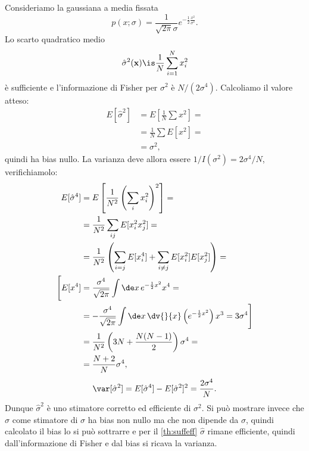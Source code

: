 \begin{example}
	Consideriamo la gaussiana a media fissata
	\begin{equation*}
		p(x;\sigma)
		= \frac1{\sqrt{2\pi}\sigma} e^{-\frac12 \frac{x^2}{\sigma^2}}.
	\end{equation*}
	Lo scarto quadratico medio
	\begin{equation*}
		\hat\sigma^2(\mathbf x)
		\is \frac1N \sum_{i=1}^N x_i^2
	\end{equation*}
	è sufficiente e l'informazione di Fisher per $\sigma^2$ è $N/(2\sigma^4)$.
	Calcoliamo il valore atteso:
	\begin{align*}
		E[\hat\sigma^2]
		&= E \left[ \frac 1N \sum x^2 \right] = \\
		&= \frac 1N \sum E[x^2] = \\
		&= \sigma^2,
	\end{align*}
	quindi ha bias nullo.
	La varianza deve allora essere $1/I(\sigma^2)=2\sigma^4/N$, verifichiamolo:
	\begin{align*}
		E[\hat\sigma^4]
		&= E \left[ \frac1{N^2}\left(\sum_ix_i^2\right)^2 \right] = \\
		&= \frac1{N^2} \sum_{ij} E[x_i^2x_j^2] = \\
		&= \frac1{N^2} \left( \sum_{i=j} E[x_i^4] + \sum_{i\neq j} E[x_i^2]E[x_j^2] \right) = \\
		\Bigg[ E[x^4]
		&= \frac{\sigma^4}{\sqrt{2\pi}} \int\de x\, e^{-\frac12 x^2} x^4 = \\
		&= - \frac{\sigma^4}{\sqrt{2\pi}} \int\de x\, \dv{}{x} \left(e^{-\frac12x^2}\right) x^3
		= 3 \sigma^4 \Bigg] \\
		&= \frac1{N^2} \left( 3N + \frac{N(N-1)}2 \right) \sigma^4 = \\
		&= \frac{N+2}N \sigma^4,
	\end{align*}
	\begin{equation*}
		\var[\hat\sigma^2]
		= E[\hat\sigma^4] - E[\hat\sigma^2]^2
		= \frac{2\sigma^4}N.
	\end{equation*}
	Dunque $\hat\sigma^2$ è uno stimatore corretto ed efficiente di $\sigma^2$.
	Si può mostrare invece che $\hat\sigma$ come stimatore di $\sigma$ ha bias non nullo
	ma che non dipende da $\sigma$,
	quindi calcolato il bias lo si può sottrarre e per il \autoref{th:suffeff} $\hat\sigma$ rimane efficiente,
	quindi dall'informazione di Fisher e dal bias si ricava la varianza.
\end{example}

